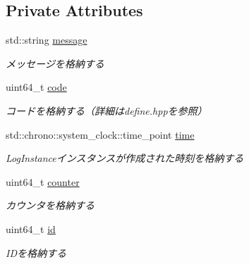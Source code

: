 \subsection*{Private Attributes}
\begin{DoxyCompactItemize}
\item 
\mbox{\label{class_g_a_1_1_log_instance_a0261a4735c56edee4ed678887f27fe61}} 
std\+::string \mbox{\hyperlink{class_g_a_1_1_log_instance_a0261a4735c56edee4ed678887f27fe61}{message}}
\begin{DoxyCompactList}\small\item\em メッセージを格納する \end{DoxyCompactList}\item 
\mbox{\label{class_g_a_1_1_log_instance_af6f9fa596cac584e654d5aff58014b0d}} 
uint64\+\_\+t \mbox{\hyperlink{class_g_a_1_1_log_instance_af6f9fa596cac584e654d5aff58014b0d}{code}}
\begin{DoxyCompactList}\small\item\em コードを格納する（詳細はdefine.\+hppを参照） \end{DoxyCompactList}\item 
\mbox{\label{class_g_a_1_1_log_instance_ae2ec73fb80d7eeae4bedeb7aa2810eda}} 
std\+::chrono\+::system\+\_\+clock\+::time\+\_\+point \mbox{\hyperlink{class_g_a_1_1_log_instance_ae2ec73fb80d7eeae4bedeb7aa2810eda}{time}}
\begin{DoxyCompactList}\small\item\em Log\+Instanceインスタンスが作成された時刻を格納する \end{DoxyCompactList}\item 
\mbox{\label{class_g_a_1_1_log_instance_a1b99305f46337a38910bc30fea9bdffc}} 
uint64\+\_\+t \mbox{\hyperlink{class_g_a_1_1_log_instance_a1b99305f46337a38910bc30fea9bdffc}{counter}}
\begin{DoxyCompactList}\small\item\em カウンタを格納する \end{DoxyCompactList}\item 
\mbox{\label{class_g_a_1_1_log_instance_a2d330b3d354f7b0b0f6f755687180e24}} 
uint64\+\_\+t \mbox{\hyperlink{class_g_a_1_1_log_instance_a2d330b3d354f7b0b0f6f755687180e24}{id}}
\begin{DoxyCompactList}\small\item\em I\+Dを格納する \end{DoxyCompactList}\end{DoxyCompactItemize}
